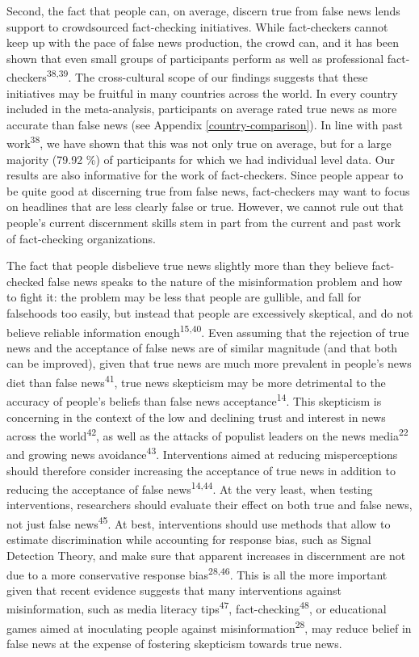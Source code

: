 \documentclass[
  man]{apa6}
\begin{document}
Second, the fact that people can, on average, discern true from false news lends support to crowdsourced fact-checking initiatives. While fact-checkers cannot keep up with the pace of false news production, the crowd can, and it has been shown that even small groups of participants perform as well as professional fact-checkers\textsuperscript{38,39}. The cross-cultural scope of our findings suggests that these initiatives may be fruitful in many countries across the world. In every country included in the meta-analysis, participants on average rated true news as more accurate than false news (see Appendix \ref{country-comparison}). In line with past work\textsuperscript{38}, we have shown that this was not only true on average, but for a large majority (79.92 \%) of participants for which we had individual level data. Our results are also informative for the work of fact-checkers. Since people appear to be quite good at discerning true from false news, fact-checkers may want to focus on headlines that are less clearly false or true. However, we cannot rule out that people's current discernment skills stem in part from the current and past work of fact-checking organizations.

The fact that people disbelieve true news slightly more than they believe fact-checked false news speaks to the nature of the misinformation problem and how to fight it: the problem may be less that people are gullible, and fall for falsehoods too easily, but instead that people are excessively skeptical, and do not believe reliable information enough\textsuperscript{15,40}. Even assuming that the rejection of true news and the acceptance of false news are of similar magnitude (and that both can be improved), given that true news are much more prevalent in people's news diet than false news\textsuperscript{41}, true news skepticism may be more detrimental to the accuracy of people's beliefs than false news acceptance\textsuperscript{14}. This skepticism is concerning in the context of the low and declining trust and interest in news across the world\textsuperscript{42}, as well as the attacks of populist leaders on the news media\textsuperscript{22} and growing news avoidance\textsuperscript{43}. Interventions aimed at reducing misperceptions should therefore consider increasing the acceptance of true news in addition to reducing the acceptance of false news\textsuperscript{14,44}. At the very least, when testing interventions, researchers should evaluate their effect on both true and false news, not just false news\textsuperscript{45}. At best, interventions should use methods that allow to estimate discrimination while accounting for response bias, such as Signal Detection Theory, and make sure that apparent increases in discernment are not due to a more conservative response bias\textsuperscript{28,46}. This is all the more important given that recent evidence suggests that many interventions against misinformation, such as media literacy tips\textsuperscript{47}, fact-checking\textsuperscript{48}, or educational games aimed at inoculating people against misinformation\textsuperscript{28}, may reduce belief in false news at the expense of fostering skepticism towards true news.
\end{document}
